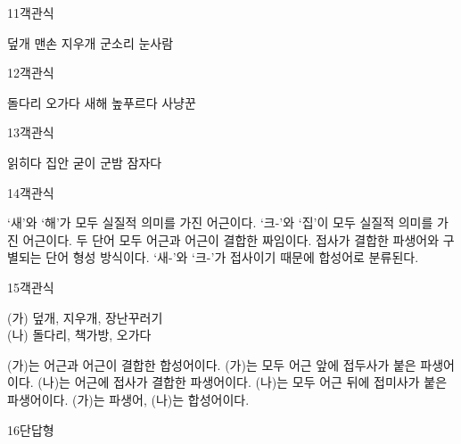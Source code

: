 \documentclass[fs9,seriesRus]{korfarm-base}
\begin{document}
\begin{kfQBlock}{11}{객관식}
\begin{kfChoices}
\kfChoice 덮개
\kfChoice 맨손
\kfChoice 지우개
\kfChoice 군소리
\kfChoice 눈사람
\end{kfChoices}
\end{kfQBlock}
\begin{kfQBlock}{12}{객관식}
\begin{kfChoices}
\kfChoice 돌다리
\kfChoice 오가다
\kfChoice 새해
\kfChoice 높푸르다
\kfChoice 사냥꾼
\end{kfChoices}
\end{kfQBlock}
\begin{kfQBlock}{13}{객관식}
\begin{kfChoices}
\kfChoice 읽히다
\kfChoice 집안
\kfChoice 굳이
\kfChoice 군밤
\kfChoice 잠자다
\end{kfChoices}
\end{kfQBlock}
\begin{kfQBlock}{14}{객관식}
\begin{kfChoices}
\kfChoice ‘새’와 ‘해’가 모두 실질적 의미를 가진 어근이다.
\kfChoice ‘크-’와 ‘집’이 모두 실질적 의미를 가진 어근이다.
\kfChoice 두 단어 모두 어근과 어근이 결합한 짜임이다.
\kfChoice 접사가 결합한 파생어와 구별되는 단어 형성 방식이다.
\kfChoice ‘새-’와 ‘크-’가 접사이기 때문에 합성어로 분류된다.
\end{kfChoices}
\end{kfQBlock}
\begin{kfQBlock}{15}{객관식}
\begin{kfEvidence}(가) 덮개, 지우개, 장난꾸러기    \\\relax
    (나) 돌다리, 책가방, 오가다\end{kfEvidence}
\begin{kfChoices}
\kfChoice (가)는 어근과 어근이 결합한 합성어이다.
\kfChoice (가)는 모두 어근 앞에 접두사가 붙은 파생어이다.
\kfChoice (나)는 어근에 접사가 결합한 파생어이다.
\kfChoice (나)는 모두 어근 뒤에 접미사가 붙은 파생어이다.
\kfChoice (가)는 파생어, (나)는 합성어이다.
\end{kfChoices}
\end{kfQBlock}
\begin{kfQBlock}{16}{단답형}
\end{kfQBlock}
\end{document}
